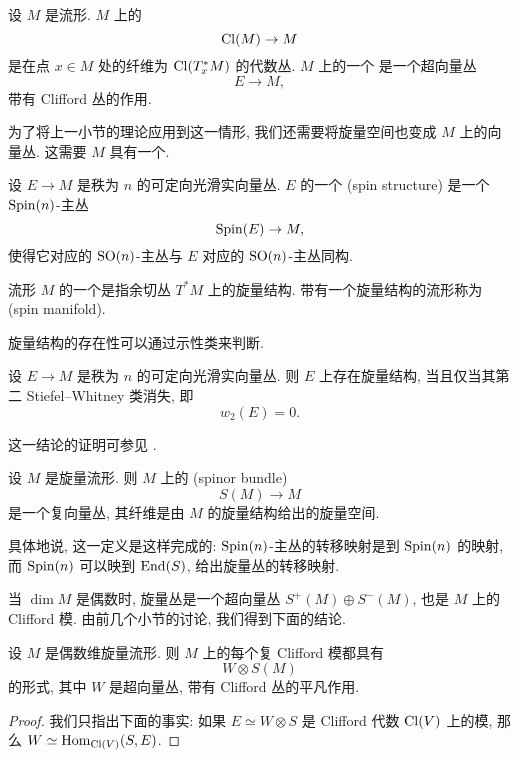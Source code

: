 \begin{definition}
    设 $M$ 是流形. $M$ 上的  
    \[ \operatorname{Cl}(M) \to M \]
    是在点 $x \in M$ 处的纤维为 $\operatorname{Cl} (T_x^* M)$
    的代数丛. $M$ 上的一个 是一个超向量丛
    \[ E \to M, \]
    带有 Clifford 丛的作用.
\end{definition}

为了将上一小节的理论应用到这一情形,
我们还需要将旋量空间也变成 $M$ 上的向量丛.
这需要 $M$ 具有一个.

\begin{definition}
    设 $E \to M$ 是秩为 $n$ 的可定向光滑实向量丛.
    $E$ 的一个 (spin structure)
    是一个 $\mathrm{Spin} (n)$-主丛
    \[ \mathrm{Spin} (E) \to M, \]
    使得它对应的 $\mathrm{SO} (n)$-主丛与 $E$ 对应的 $\mathrm{SO} (n)$-主丛同构.
    
    流形 $M$ 的一个是指余切丛 $T^* M$ 上的旋量结构.
    带有一个旋量结构的流形称为 (spin manifold).
\end{definition}

旋量结构的存在性可以通过示性类来判断.

\begin{theorem}
    设 $E \to M$ 是秩为 $n$ 的可定向光滑实向量丛.
    则 $E$ 上存在旋量结构, 当且仅当其第二 Stiefel--Whitney 类消失, 即
    \[ w_2 (E) = 0. \]
\end{theorem}

这一结论的证明可参见 \cite[定理 II.1.7]{lawson-michelsohn}.

\begin{definition}
    设 $M$ 是旋量流形. 则 $M$ 上的 (spinor bundle)
    \[ S(M) \to M \]
    是一个复向量丛, 其纤维是由 $M$ 的旋量结构给出的旋量空间.
\end{definition}

具体地说, 这一定义是这样完成的:
$\mathrm{Spin} (n)$-主丛的转移映射是到 $\mathrm{Spin} (n)$ 的映射,
而 $\mathrm{Spin} (n)$ 可以映到 $\operatorname{End} (S)$, 给出旋量丛的转移映射.

当 $\dim M$ 是偶数时, 旋量丛是一个超向量丛 $S^+ (M) \oplus S^- (M)$,
也是 $M$ 上的 Clifford 模. 由前几个小节的讨论, 我们得到下面的结论.

\begin{proposition} \label{thm-8-cl-mod-can-form}
    设 $M$ 是偶数维旋量流形. 则 $M$ 上的每个复 Clifford 模都具有
    \[ W \otimes S(M) \]
    的形式, 其中 $W$ 是超向量丛, 带有 Clifford 丛的平凡作用.
\end{proposition}

\begin{proof}
    我们只指出下面的事实: 如果 $E \simeq W \otimes S$ 是 Clifford 代数 $\operatorname{Cl} (V)$ 上的模,
    那么 $W \simeq \operatorname{Hom}_{\operatorname{Cl} (V)} (S, E)$.
\end{proof}


